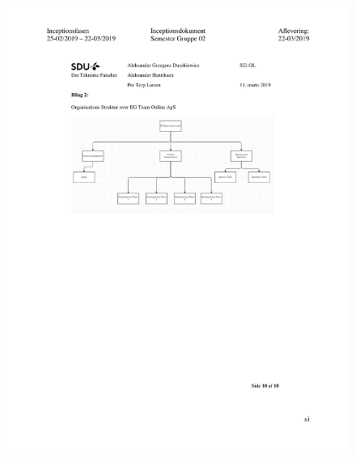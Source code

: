 \begin{figure}[hb]
  \includegraphics[scale = 0.33]{./PNG/Inceptions/Gruppe 02 + InceptionsDokument-44.jpg} 
\end{figure}

